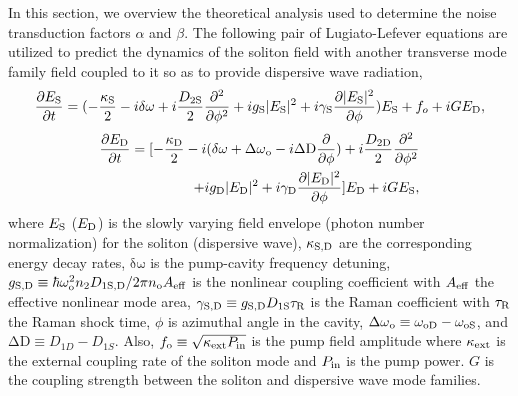 \documentclass[noshowpacs,amsmath,
twocolumn,
superscriptaddress,
8pt,
aps,prb]{revtex4-2}
\begin{document}
\begin{footnotesize}
\medskip


\noindent In this section, we overview the theoretical analysis used to determine the noise transduction factors $\alpha$ and $\beta$. The following pair of Lugiato-Lefever equations \cite{lugiato1987spatial,herr2014temporal,yi2017single} are utilized to predict the dynamics of the soliton field with another transverse mode family field coupled to it so as to provide dispersive wave radiation, 
\begin{equation}
    \frac{\partial E_{\rm S}}{\partial t}=(-\frac{\kappa_{\rm S}}{2}-i\mathrm{\delta \omega}+i\frac{D_{2\rm S}}{2}\frac{\partial^2}{\partial \phi^2}+ig_{\rm S}|E_{\rm S}|^2+i\gamma_{\rm S}\frac{\partial |E_{\rm S}|^2}{\partial \phi})E_{\rm S}+f_o+iGE_{\rm D}, 
\end{equation}
\begin{equation}
\begin{split}
    \frac{\partial E_{\rm D}}{\partial t}=[-\frac{\kappa_{\rm D}}{2}
    -i(\mathrm{\delta \omega}+\mathrm{\Delta\omega}_{\rm o}-i\mathrm{\Delta D}\frac{\partial }{\partial \phi})
    +i\frac{D_{2\rm D}}{2}\frac{\partial^2}{\partial \phi^2}\\
    +ig_{\rm D}|E_{\rm D}|^2+i\gamma_{\rm D}\frac{\partial |E_{\rm D}|^2}{\partial \phi}]E_{\rm D}+iGE_{\rm S}, 
\end{split}
\end{equation}
where $E_{\rm S}$ ($E_{\rm D}$) is the slowly varying field envelope (photon number normalization) for the soliton (dispersive wave), $\kappa_{\rm S,D}$ are the corresponding energy decay rates, $\mathrm{\delta\omega}$ is the pump-cavity frequency detuning, $g_{\rm S,D} \equiv\hbar\omega_{\rm o}^2 n_2 D_{\rm 1S,D}/2\pi n_{\rm o} A_{\rm eff}$ is the nonlinear coupling coefficient with $A_{\rm eff}$ the effective nonlinear mode area, $\gamma_{\rm S,D} \equiv g_{\rm S,D} D_{\rm 1S}\tau_{\rm R}$ is the Raman coefficient with $\tau_{\rm R}$ the Raman shock time,  $\phi$ is azimuthal angle in the cavity, $\mathrm{\Delta\omega}_{\rm o} \equiv \omega_{\rm oD}-\omega_{\rm oS}$, and $\mathrm{\Delta D} \equiv D_{1D}-D_{1S}$. Also,  $f_{\rm o} \equiv \sqrt{\kappa_{\rm ext} P_{\rm in}}$ is the pump field amplitude where $\kappa_{\rm ext}$ is the external coupling rate of the soliton mode and $P_{\rm in}$ is the pump power.  $G$ is the coupling strength between the soliton and dispersive wave mode families. 


\end{footnotesize}
\end{document}
